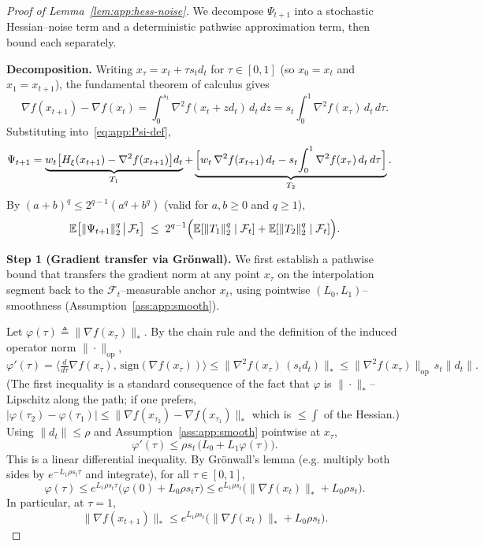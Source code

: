 \documentclass{article}
\theoremstyle{plain}
\theoremstyle{definition}
\theoremstyle{remark}
\begin{document}
\begin{proof}[Proof of Lemma~\ref{lem:app:hess-noise}]
We decompose $\Psi_{t+1}$ into a stochastic Hessian--noise term and a
deterministic pathwise approximation term, then bound each separately.

\smallskip\noindent\textbf{Decomposition.}
Writing $x_\tau = x_t + \tau s_t d_t$ for $\tau \in [0, 1]$ (so $x_0 =
x_t$ and $x_1 = x_{t+1}$), the fundamental theorem of calculus gives
\[
  \nabla f(x_{t+1}) - \nabla f(x_t)
  = \int_0^{s_t} \nabla^2 f(x_t + z d_t)\, d_t\, dz
  = s_t \int_0^1 \nabla^2 f(x_\tau)\, d_t\, d\tau.
\]
Substituting into~\eqref{eq:app:Psi-def},
\begin{align}
  \Psi_{t+1}
  &= \underbrace{w_t\bigl[H_\xi(x_{t+1}) - \nabla^2 f(x_{t+1})\bigr] d_t}_{T_1}
  + \underbrace{\Bigl[w_t\, \nabla^2 f(x_{t+1})\, d_t
      - s_t\!\int_0^1 \nabla^2 f(x_\tau)\, d_t\, d\tau\Bigr]}_{T_2}.
  \label{eq:app:Psi-decomp}
\end{align}
By $(a+b)^q \leq 2^{q-1}(a^q + b^q)$ (valid for $a, b \geq 0$ and $q \geq 1$),
\begin{equation}
  \mathbb{E}\bigl[\|\Psi_{t+1}\|_2^q \,\big|\, \mathcal{F}_t\bigr]
  \;\leq\; 2^{q-1}\Bigl(
    \mathbb{E}[\|T_1\|_2^q \mid \mathcal{F}_t]
    + \mathbb{E}[\|T_2\|_2^q \mid \mathcal{F}_t]\Bigr).
  \label{eq:app:Psi-split}
\end{equation}

\smallskip\noindent\textbf{Step 1 (Gradient transfer via Gr\"onwall).}
We first establish a pathwise bound that transfers the gradient norm at
any point $x_\tau$ on the interpolation segment back to the
$\mathcal{F}_t$--measurable anchor $x_t$, using pointwise
$(L_0, L_1)$--smoothness (Assumption~\ref{ass:app:smooth}).

Let $\varphi(\tau) \triangleq \|\nabla f(x_\tau)\|_*$. By the chain rule
and the definition of the induced operator norm $\|\cdot\|_{\mathrm{op}}$,
\[
  \varphi'(\tau)
  = \bigl\langle \tfrac{d}{d\tau}\nabla f(x_\tau),\,
      \mathrm{sign}(\nabla f(x_\tau))\bigr\rangle
  \leq \|\nabla^2 f(x_\tau)\,(s_t d_t)\|_*
  \leq \|\nabla^2 f(x_\tau)\|_{\mathrm{op}}\, s_t \|d_t\|.
\]
(The first inequality is a standard consequence of the fact that
$\varphi$ is $\|\cdot\|_*$--Lipschitz along the path; if one prefers,
$|\varphi(\tau_2) - \varphi(\tau_1)| \leq \|\nabla f(x_{\tau_2}) -
\nabla f(x_{\tau_1})\|_*$ which is $\leq \int$ of the Hessian.) Using
$\|d_t\| \leq \rho$ and Assumption~\ref{ass:app:smooth} pointwise at
$x_\tau$,
\[
  \varphi'(\tau) \leq \rho s_t\, \bigl(L_0 + L_1 \varphi(\tau)\bigr).
\]
This is a linear differential inequality. By Gr\"onwall's lemma (e.g.
multiply both sides by $e^{-L_1\rho s_t \tau}$ and integrate), for all
$\tau \in [0, 1]$,
\begin{equation}
  \varphi(\tau)
  \leq e^{L_1 \rho s_t \tau}\bigl(\varphi(0) + L_0 \rho s_t \tau\bigr)
  \leq e^{L_1 \rho s_t}\bigl(\|\nabla f(x_t)\|_* + L_0 \rho s_t\bigr).
  \label{eq:app:gronwall}
\end{equation}
In particular, at $\tau = 1$,
\begin{equation}
  \|\nabla f(x_{t+1})\|_*
  \leq e^{L_1 \rho s_t}\bigl(\|\nabla f(x_t)\|_* + L_0 \rho s_t\bigr).
  \label{eq:app:gronwall-endpoint}
\end{equation}


\end{proof}
\end{document}
